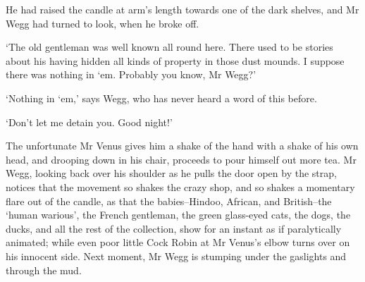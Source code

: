 He had raised the candle at arm’s length towards one of the dark
shelves, and Mr Wegg had turned to look, when he broke off.

‘The old gentleman was well known all round here. There used to be
stories about his having hidden all kinds of property in those dust
mounds. I suppose there was nothing in ‘em. Probably you know, Mr Wegg?’

‘Nothing in ‘em,’ says Wegg, who has never heard a word of this before.

‘Don’t let me detain you. Good night!’

The unfortunate Mr Venus gives him a shake of the hand with a shake of
his own head, and drooping down in his chair, proceeds to pour himself
out more tea. Mr Wegg, looking back over his shoulder as he pulls the
door open by the strap, notices that the movement so shakes the crazy
shop, and so shakes a momentary flare out of the candle, as that the
babies--Hindoo, African, and British--the ‘human warious’, the French
gentleman, the green glass-eyed cats, the dogs, the ducks, and all
the rest of the collection, show for an instant as if paralytically
animated; while even poor little Cock Robin at Mr Venus’s elbow turns
over on his innocent side. Next moment, Mr Wegg is stumping under the
gaslights and through the mud.



